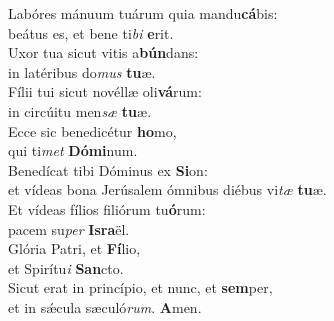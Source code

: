 \evenverse Labóres mánuum tuárum quia mandu\textbf{cá}bis:~\*\\
\evenverse beátus es, et bene ti\textit{bi} \textbf{e}rit.\\
\oddverse Uxor tua sicut vitis a\textbf{bún}dans:~\*\\
\oddverse in latéribus do\textit{mus} \textbf{tu}æ.\\
\evenverse Fílii tui sicut novéllæ oli\textbf{vá}rum:~\*\\
\evenverse in circúitu men\textit{sæ} \textbf{tu}æ.\\
\oddverse Ecce sic benedicétur \textbf{ho}mo,~\*\\
\oddverse qui ti\textit{met} \textbf{Dó}\textbf{mi}num.\\
\evenverse Benedícat tibi Dóminus ex \textbf{Si}on:~\*\\
\evenverse et vídeas bona Jerúsalem ómnibus diébus vi\textit{tæ} \textbf{tu}æ.\\
\oddverse Et vídeas fílios filiórum tu\textbf{ó}rum:~\*\\
\oddverse pacem su\textit{per} \textbf{Is}\textbf{ra}ël.\\
\evenverse Glória Patri, et \textbf{Fí}lio,~\*\\
\evenverse et Spirítu\textit{i} \textbf{San}cto.\\
\oddverse Sicut erat in princípio, et nunc, et \textbf{sem}per,~\*\\
\oddverse et in sǽcula sæculó\textit{rum}. \textbf{A}men.\\
